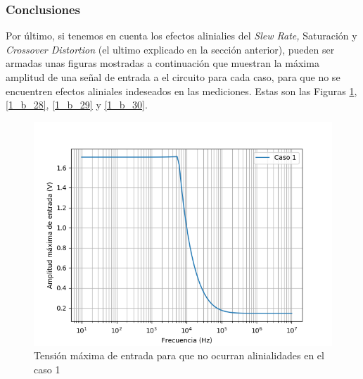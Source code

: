 \subsubsection{Conclusiones}

Por último, si tenemos en cuenta los efectos alinialies del \emph{Slew
Rate, }Saturación y \emph{Crossover Distortion} (el ultimo explicado
en la sección anterior), pueden ser armadas unas figuras mostradas
a continuación que muestran la máxima amplitud de una señal de entrada
a el circuito para cada caso, para que no se encuentren efectos aliniales
indeseados en las mediciones. Estas son las Figuras \ref{1_b_27},
\ref{1_b_28}, \ref{1_b_29} y \ref{1_b_30}.

\begin{figure}[H]
\begin{centering}
\includegraphics[scale=0.5]{../Ex1/iB/Resources1b/AmplMaxVsFreq1}
\par\end{centering}
\caption{Tensión máxima de entrada para que no ocurran alinialidades en el
caso 1}
\label{1_b_27}

\end{figure}


